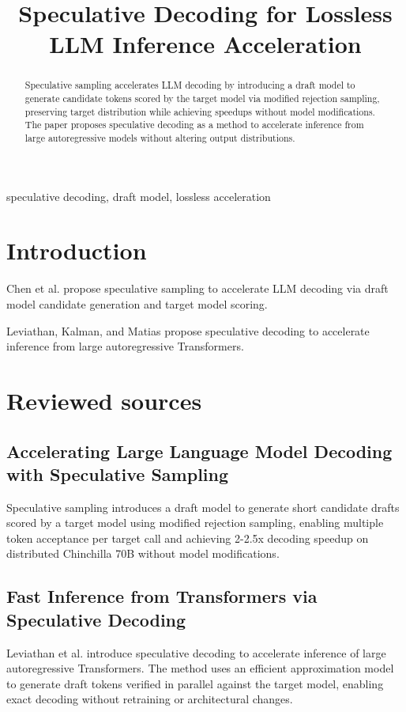 \documentclass[conference]{IEEEtran}
\begin{document}
\title{Speculative Decoding for Lossless LLM Inference Acceleration}
\author{}
\maketitle
\begin{abstract}
Speculative sampling accelerates LLM decoding by introducing a draft model to generate candidate tokens scored by the target model via modified rejection sampling, preserving target distribution while achieving speedups without model modifications. \cite{chen2023accelerating} The paper proposes speculative decoding as a method to accelerate inference from large autoregressive models without altering output distributions. \cite{leviathan2022fast}
\end{abstract}
\begin{IEEEkeywords}speculative decoding, draft model, lossless acceleration\end{IEEEkeywords}
\section{Introduction}
Chen et al. propose speculative sampling to accelerate LLM decoding via draft model candidate generation and target model scoring. \cite{chen2023accelerating}

Leviathan, Kalman, and Matias propose speculative decoding to accelerate inference from large autoregressive Transformers. \cite{leviathan2022fast}

\section{Reviewed sources}
\subsection{Accelerating Large Language Model Decoding with Speculative Sampling}
Speculative sampling introduces a draft model to generate short candidate drafts scored by a target model using modified rejection sampling, enabling multiple token acceptance per target call and achieving 2-2.5x decoding speedup on distributed Chinchilla 70B without model modifications. \cite{chen2023accelerating}

\subsection{Fast Inference from Transformers via Speculative Decoding}
Leviathan et al. introduce speculative decoding to accelerate inference of large autoregressive Transformers. The method uses an efficient approximation model to generate draft tokens verified in parallel against the target model, enabling exact decoding without retraining or architectural changes. \cite{leviathan2022fast}
\end{document}
